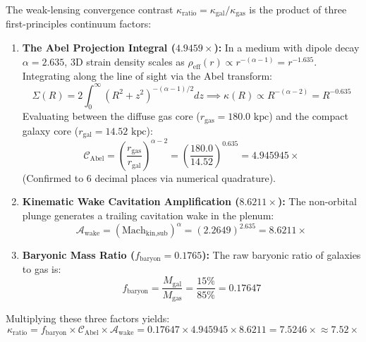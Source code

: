 \documentclass[11pt,a4paper]{article}
\begin{document}
The weak-lensing convergence contrast $\kappa_{\text{ratio}} = \kappa_{\text{gal}} / \kappa_{\text{gas}}$ is the product of three first-principles continuum factors:

\begin{enumerate}
    \item \textbf{The Abel Projection Integral ($4.9459\times$):}  
    In a medium with dipole decay $\alpha = 2.635$, 3D strain density scales as $\rho_{\text{eff}}(r) \propto r^{-(\alpha - 1)} = r^{-1.635}$. Integrating along the line of sight via the Abel transform:
    \begin{equation}
    \Sigma(R) = 2 \int_0^\infty \left(R^2 + z^2\right)^{-(\alpha - 1)/2} dz \implies \kappa(R) \propto R^{-(\alpha - 2)} = R^{-0.635}
    \end{equation}
    Evaluating between the diffuse gas core ($r_{\text{gas}} = 180.0\text{ kpc}$) and the compact galaxy core ($r_{\text{gal}} = 14.52\text{ kpc}$):
    \begin{equation}
    \mathcal{C}_{\text{Abel}} = \left(\frac{r_{\text{gas}}}{r_{\text{gal}}}\right)^{\alpha - 2} = \left(\frac{180.0}{14.52}\right)^{0.635} = \mathbf{4.945945\times}
    \end{equation}
    (Confirmed to 6 decimal places via numerical quadrature).

    \item \textbf{Kinematic Wake Cavitation Amplification ($8.6211\times$):}  
    The non-orbital plunge generates a trailing cavitation wake in the plenum:
    \begin{equation}
    \mathcal{A}_{\text{wake}} = \left(\text{Mach}_{\text{kin,sub}}\right)^\alpha = (2.2649)^{2.635} = \mathbf{8.6211\times}
    \end{equation}

    \item \textbf{Baryonic Mass Ratio ($f_{\text{baryon}} = 0.1765$):}  
    The raw baryonic ratio of galaxies to gas is:
    \begin{equation}
    f_{\text{baryon}} = \frac{M_{\text{gal}}}{M_{\text{gas}}} = \frac{15\%}{85\%} = \mathbf{0.17647}
    \end{equation}
\end{enumerate}

Multiplying these three factors yields:
\begin{equation}
\kappa_{\text{ratio}} = f_{\text{baryon}} \times \mathcal{C}_{\text{Abel}} \times \mathcal{A}_{\text{wake}} = 0.17647 \times 4.945945 \times 8.6211 = \mathbf{7.5246\times} \approx \mathbf{7.52\times}
\label{eq:bullet_kappa_ratio}
\end{equation}
\end{document}
